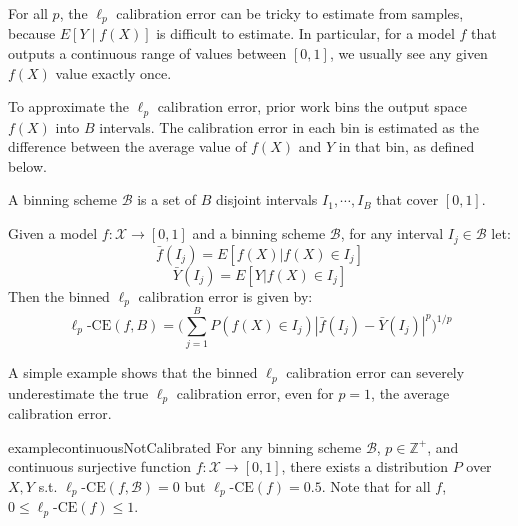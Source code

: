 For all $p$, the $\ell_p$ calibration error can be tricky to estimate from samples, because $E[Y \; | \; f(X)]$ is difficult to estimate.
In particular,  for a model $f$ that outputs a continuous range of values between $[0, 1]$, we usually see any given $f(X)$ value exactly once.

To approximate the $\ell_p$ calibration error, prior work bins the output space $f(X)$ into $B$ intervals.
The calibration error in each bin is estimated as the difference between the average value of $f(X)$ and $Y$ in that bin, as defined below.

\begin{definition}
A binning scheme $\mathcal{B}$ is a set of $B$ disjoint intervals $I_1, \cdots, I_B$ that cover $[0, 1]$.
\end{definition}

\begin{definition}
Given a model $f : \mathcal{X} \to [0, 1]$ and a binning scheme $\mathcal{B}$, for any interval $I_j \in \mathcal{B}$ let:
\[ \bar{f}(I_j) = E[f(X) | f(X) \in I_j] \]
\[ \bar{Y}(I_j) = E[Y | f(X) \in I_j] \]
Then the binned $\ell_p$ calibration error is given by:
\[ \ell_p\mbox{-CE}(f, B) = \Big( \sum_{j=1}^B P(f(X) \in I_j) \left|\bar{f}(I_j) - \bar{Y}(I_j) \right|^p  \Big)^{1/p} \]
\end{definition}

A simple example shows that the binned $\ell_p$ calibration error can severely underestimate the true $\ell_p$ calibration error, even for $p=1$, the average calibration error.

\begin{restatable}{example}{continuousNotCalibrated}
\label{ex:continuous-not-calibrated}
For any binning scheme $\mathcal{B}$, $p \in \mathbb{Z}^+$, and continuous surjective function $f : \mathcal{X} \to [0, 1]$, there exists a distribution $P$ over $X, Y$ s.t. $\ell_p\mbox{-CE}(f, \mathcal{B}) = 0$ but $\ell_p\mbox{-CE}(f) = 0.5$.
Note that for all $f$, $0 \leq \ell_p\mbox{-CE}(f) \leq 1$.
\end{restatable}

